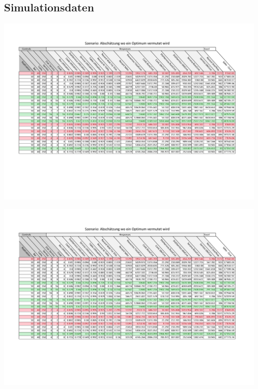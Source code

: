 \documentclass[ngerman,a4paper,12pt]{scrreprt}
\begin{document}
\appendix
\begin{landscape}
	\chapter{Simulationsdaten}
	\begin{center}
		\includegraphics[page=1, trim=2cm 6cm 2cm 2cm, clip=true, width=1.35\textwidth]{../Auswertung/Data.pdf}
	\end{center}
	\begin{center}
		\includegraphics[page=2, trim=2cm 14cm 2cm 2cm, clip=true, width=1.425\textwidth]{../Auswertung/Data.pdf}

\end{center}
\end{landscape}
\end{document}
